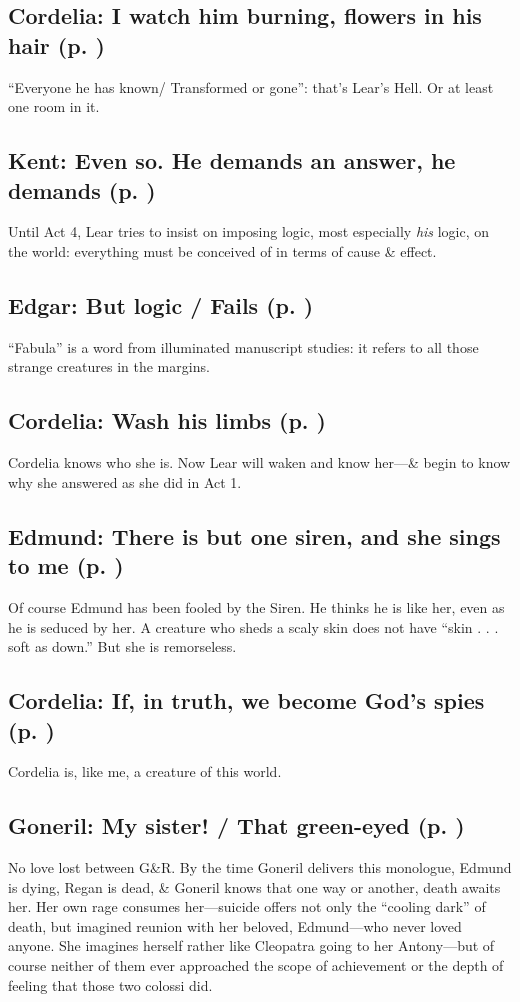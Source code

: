 \subsection*{Cordelia: I watch him burning, flowers in his hair (p. \pageref{ch:lear_bg})}
``Everyone he has known/ Transformed or gone'': that's Lear's Hell. Or at least one room in it.

\subsection*{Kent: Even so. He demands an answer, he demands (p. \pageref{ch:lear_bh})}
Until Act 4, Lear tries to insist on imposing logic, most especially \emph{his} logic, on the world: everything must be conceived of in terms of cause \& effect.

\subsection*{Edgar: But logic / Fails (p. \pageref{ch:lear_bi})}
``Fabula'' is a word from illuminated manuscript studies: it refers to all those strange creatures in the margins.

\subsection*{Cordelia: Wash his limbs (p. \pageref{ch:lear_bj})}

Cordelia knows who she is. Now Lear will waken and know her---\& begin to know why she answered as she did in Act 1.

\subsection*{Edmund: There is but one siren, and she sings to me (p. \pageref{ch:lear_bk})}
Of course Edmund has been fooled by the Siren. He thinks he is like her, even as he is seduced by her. A creature who sheds a scaly skin does not have ``skin . . . soft as down.'' But she is remorseless.

\subsection*{Cordelia: If, in truth, we become God's spies (p. \pageref{ch:lear_bl})}
Cordelia is, like me, a creature of this world.

\subsection*{Goneril: My sister! / That green-eyed (p. \pageref{ch:lear_bm})}
No love lost between G\&R. By the time Goneril delivers this monologue, Edmund is dying, Regan is dead, \& Goneril knows that one way or another, death awaits her. Her own rage consumes her---suicide offers not only the ``cooling dark'' of death, but imagined reunion with her beloved, Edmund---who never loved anyone. She imagines herself rather like Cleopatra going to her Antony---but of course neither of them ever approached the scope of achievement or the depth of feeling that those two colossi did.

